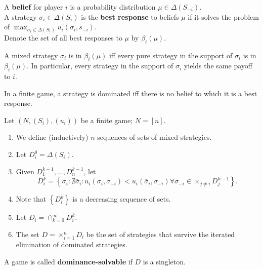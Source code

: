 \documentclass[11pt]{elegantbook_2}
\begin{document}
\begin{definition}
    A \textbf{belief} for player $i$ is a probability distribution $\mu\in\Delta(S_{-i})$.\\
    A strategy $\sigma_i \in \Delta(S_i)$ is the \textbf{best response} to beliefs $\mu$ if it solves the problem of $\max_{\sigma_i\in\Delta(S_i)}u_i(\sigma_i,s_{-i})$.\\
    Denote the set of all best responses to $\mu$ by $\beta_i(\mu)$.
\end{definition}
\begin{lemma}
    A mixed strategy $\sigma_i$ is in $\beta_i(\mu)$ iff every pure strategy in the support of $\sigma_i$ is in $\beta_i(\mu)$. In particular, every strategy in the support of $\sigma_i$ yields the same payoff to $i$.
\end{lemma}

\begin{theorem}
    In a finite game, a strategy is dominated iff there is no belief to which it is a best response.
\end{theorem}


\begin{definition}
    Let $\left(N,\left(S_i\right),\left(u_i\right)\right)$ be a finite game; $N=[n]$.
    \begin{enumerate}[$\bullet$]
        \item We define (inductively) $n$ sequences of sets of mixed strategies.
        \item Let $D_i^0=\Delta\left(S_i\right)$.
        \item Given $D_1^{k-1}, \ldots, D_n^{k-1}$, let
        $$
        D_i^k=\left\{\sigma_i: \nexists \bar{\sigma}_i: u_i\left(\sigma_i, \sigma_{-i}\right)<u_i\left(\bar{\sigma}_i, \sigma_{-i}\right) \forall \sigma_{-i} \in \times_{j \neq i} D_j^{k-1}\right\} .
        $$
        \item Note that $\left\{D_i^k\right\}$ is a decreasing sequence of sets.
        \item Let $D_i = \cap_{k=0}^\infty D_i^k$.
        \item The set $D = \times_{i=1}^n D_i$ be the set of strategies that survive the iterated elimination of dominated strategies.
    \end{enumerate}
    A game is called \textbf{dominance-solvable} if $D$ is a singleton.
\end{definition}
\end{document}

